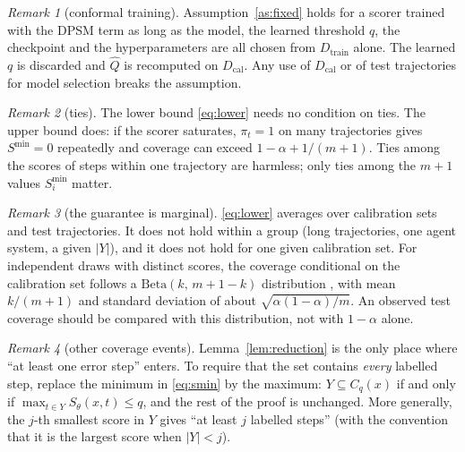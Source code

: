 \documentclass[10pt,a4paper]{article}
\theoremstyle{definition}
\theoremstyle{remark}
\newtheorem{remark}{Remark}
\newcommand{\C}{C}
\newcommand{\Qhat}{\widehat Q}
\newcommand{\Smin}{S^{\min}}
\newcommand{\Dtr}{D_{\mathrm{train}}}
\newcommand{\Dcal}{D_{\mathrm{cal}}}
\begin{document}
\begin{remark}[conformal training] \label{rem:training}
Assumption~\ref{as:fixed} holds for a scorer trained with the DPSM term as long as the model, the learned threshold $q$, the checkpoint and the hyperparameters are all chosen from $\Dtr$ alone. The learned $q$ is discarded and $\Qhat$ is recomputed on $\Dcal$. Any use of $\Dcal$ or of test trajectories for model selection breaks the assumption.
\end{remark}

\begin{remark}[ties]
The lower bound \eqref{eq:lower} needs no condition on ties. The upper bound does: if the scorer saturates, $\pi_t=1$ on many trajectories gives $\Smin=0$ repeatedly and coverage can exceed $1-\alpha+1/(m+1)$. Ties among the scores of steps within one trajectory are harmless; only ties among the $m+1$ values $\Smin_i$ matter.
\end{remark}

\begin{remark}[the guarantee is marginal]
\eqref{eq:lower} averages over calibration sets and test trajectories. It does not hold within a group (long trajectories, one agent system, a given $|Y|$), and it does not hold for one given calibration set. For independent draws with distinct scores, the coverage conditional on the calibration set follows a $\mathrm{Beta}(k,\,m+1-k)$ distribution \cite{vovk2012conditional}, with mean $k/(m+1)$ and standard deviation of about $\sqrt{\alpha(1-\alpha)/m}$. An observed test coverage should be compared with this distribution, not with $1-\alpha$ alone.
\end{remark}

\begin{remark}[other coverage events]
Lemma~\ref{lem:reduction} is the only place where ``at least one error step'' enters. To require that the set contains \emph{every} labelled step, replace the minimum in \eqref{eq:smin} by the maximum: $Y\subseteq\C_q(x)$ if and only if $\max_{t\in Y}S_\theta(x,t)\le q$, and the rest of the proof is unchanged. More generally, the $j$-th smallest score in $Y$ gives ``at least $j$ labelled steps'' (with the convention that it is the largest score when $|Y|<j$).
\end{remark}
\end{document}
